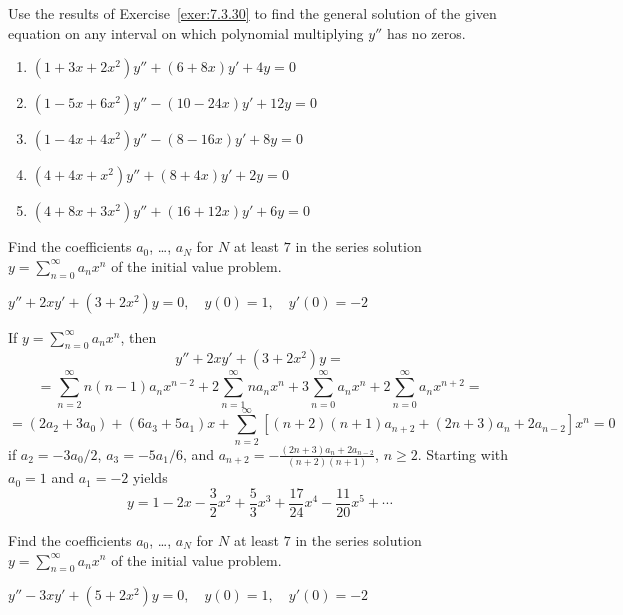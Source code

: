 \documentclass{ximera}
\begin{document}
\begin{problem}\label{exer:7.3.31}
Use the results of Exercise~\ref{exer:7.3.30} to find the general solution
of the given equation on any interval on which polynomial multiplying
$y''$ has no zeros.

\begin{enumerate}
\item $(1+3x+2x^2)y''+(6+8x)y'+4y=0$

\item $(1-5x+6x^2)y''-(10-24x)y'+12y=0$

\item $(1-4x+4x^2)y''-(8-16x)y'+8y=0$

\item $(4+4x+x^2)y''+(8+4x)y'+2y=0$

\item $(4+8x+3x^2)y''+(16+12x)y'+6y=0$

\end{enumerate}

\end{problem}



\begin{problem}\label{exer:7.3.32}
Find
the coefficients  $a_0$, \dots, $a_N$ for $N$ at least $7$ in the series
solution
$y=\sum_{n=0}^\infty a_nx^n$
 of the initial value problem.
 
$y''+2xy'+(3+2x^2)y=0,\quad y(0)=1,\quad y'(0)=-2$

\begin{solution}
    If $y=\sum_{n=0}^\infty a_nx^n$, then
$$y''+2xy'+(3+2x^2)y=$$
$$=\sum_{n=2}^\infty n(n-1)a_nx^{n-2}
+2\sum_{n=1}^\infty na_nx^n
+3\sum_{n=0}^\infty a_nx^n
+2\sum_{n=0}^\infty a_nx^{n+2}=$$
$$=(2a_2+3a_0)+(6a_3+5a_1)x+
\sum_{n=2}^\infty[(n+2)(n+1)a_{n+2}+(2n+3)a_n+2a_{n-2}]x^n=0$$ if
$a_2=-3a_0/2$, $a_3=-5a_1/6$, and
$a_{n+2}=-\frac{(2n+3)a_n+2a_{n-2}}{(n+2)(n+1)}$,
 $n\geq 2$.
Starting with $a_0=1$ and $a_1=-2$ yields
$$y=1-2x-\frac{3}{2}x^2+\frac{5}{3}x^3+\frac{17}{24}x^4-\frac{11}{20}x^5+\cdots$$
\end{solution}
\end{problem}


\begin{problem}\label{exer:7.3.33}
Find
the coefficients  $a_0$, \dots, $a_N$ for $N$ at least $7$ in the series
solution
$y=\sum_{n=0}^\infty a_nx^n$
 of the initial value problem.
 
$y''-3xy'+(5+2x^2)y=0,\quad y(0)=1,\quad y'(0)=-2$
\end{problem}
\end{document}
